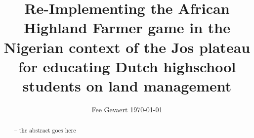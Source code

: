 \documentclass[journal, dvipsnames]{IEEEtran}
\title{Re-Implementing the African Highland Farmer game in the Nigerian context of the Jos plateau for educating Dutch highschool students on land management}
\author{Fee Gevaert \orcidlink{https://orcid.org/0009-0008-2311-6336} \today{}}
\begin{document}
\maketitle

\begin{abstract}
-- the abstract goes here
\end{abstract}















\ifCLASSOPTIONcaptionsoff
  \newpage
\fi


\printbibliography
\end{document}
